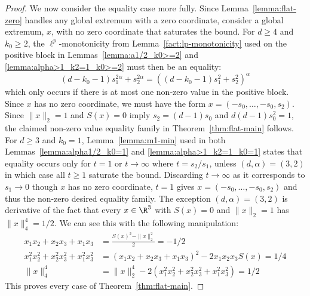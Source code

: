 \documentclass[11pt]{article}
\begin{document}
\begin{proof}
    We now consider the equality case more fully. Since Lemma~\ref{lemma:flat-zero} handles any global extremum with a zero coordinate, consider a global extremum, $x$, with no zero coordinate that saturates the bound. For $d\geq 4$ and $k_0\geq 2$, the $\ell^p $-monotonicity from Lemma~\ref{fact:lp-monotonicity} used on the positive block in Lemmas~\ref{lemma:a1/2_k0>=2} and \ref{lemma:alpha>1_k2=1_k0>=2} must then be an equality:
    \begin{equation}
        (d-k_0-1)s_1^{2\alpha}+s_2^{2\alpha}= ((d-k_0-1)s_1^2+s_2^2)^\alpha
    \end{equation}
    which only occurs if there is at most one non-zero value in the positive block. Since $x$ has no zero coordinate, we must have the form $x=(-s_0,\dots,-s_0,s_2)$. Since $\|x\|_2=1$ and $S(x)=0$ imply $s_2=(d-1)s_0$ and $d(d-1)s_0^2=1$, the claimed non-zero value equality family in Theorem~\ref{thm:flat-main} follows. For $d\geq 3$ and $k_0=1$, Lemma~\ref{lemma:m1-min} used in both Lemmas~\ref{lemma:alpha1/2_k0=1} and \ref{lemma:alpha>1_k2=1_k0=1} states that equality occurs only for $t=1$ or $t\to\infty$ where $t=s_2/s_1$, unless $(d,\alpha)=(3,2)$ in which case all $t\geq 1$ saturate the bound. Discarding $t\to \infty$ as it corresponds to $s_1\to 0$ though $x$ has no zero coordinate, $t=1$ gives $x=(-s_0,\dots,-s_0,s_2)$ and thus the non-zero desired equality family. The exception $(d,\alpha)=(3,2)$ is derivative of the fact that every $x\in \R^3 $ with $S(x)=0$ and $\|x\|_2=1$ has $\|x\|_4^4=1/2$. We can see this with the following manipulation:
    \begin{equation}
        \begin{aligned}
            x_1x_2+x_2x_3+x_1x_3&=\frac{S(x)^2-\|x\|_2^2}{2}=-1/2 \\
            x_1^2x_2^2+x_2^2x_3^2+x_1^2x_3^2&=(x_1x_2+x_2x_3+x_1x_3)^2-2x_1x_2x_3S(x)=1/4\\
            \|x\|_4^4 &=\|x\|_2^4 -2(x_1^2x_2^2+x_2^2x_3^2+x_1^2x_3^2)=1/2
        \end{aligned}
    \end{equation}
    This proves every case of Theorem~\ref{thm:flat-main}.
\end{proof}
\end{document}
